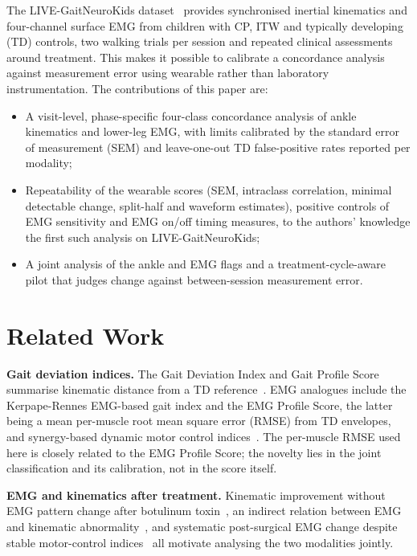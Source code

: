 \documentclass[conference]{IEEEtran}
\newcommand{\rone}[1]{{\color{rI}#1}}
\newcommand{\rtwo}[1]{{\color{rII}#1}}
\newcommand{\rthree}[1]{{\color{rIII}#1}}
\newcommand{\rone}[1]{#1}
\newcommand{\rtwo}[1]{#1}
\newcommand{\rthree}[1]{#1}
\begin{document}
The LIVE-GaitNeuroKids dataset~\cite{fernandez2026live,zenodo2026live} provides synchronised inertial kinematics and four-channel surface EMG from children with CP, ITW and typically developing (TD) controls, two walking trials per session and repeated clinical assessments around treatment. This makes it possible to calibrate a concordance analysis against measurement error using wearable rather than laboratory instrumentation. The contributions of this paper are:
\begin{itemize}
\item A visit-level, phase-specific four-class concordance analysis of ankle kinematics and lower-leg EMG, \rtwo{with limits calibrated by the standard error of measurement (SEM) and leave-one-out TD false-positive rates reported per modality;}
\item \rtwo{Repeatability of the wearable scores (SEM, intraclass correlation, minimal detectable change, split-half and waveform estimates), positive controls of EMG sensitivity and} \rthree{EMG on/off timing measures,} to the authors' knowledge the first such analysis on LIVE-GaitNeuroKids;
\item \rtwo{A joint analysis of the ankle and EMG flags} and \rone{a treatment-cycle-aware pilot that judges change against between-session measurement error.}
\end{itemize}

\section{Related Work}
\textbf{Gait deviation indices.} The Gait Deviation Index and Gait Profile Score summarise kinematic distance from a TD reference~\cite{schwartz2008gdi,baker2009gps}. EMG analogues include the Kerpape-Rennes EMG-based gait index and the EMG Profile Score, the latter being a mean per-muscle root mean square error (RMSE) from TD envelopes, and synergy-based dynamic motor control indices~\cite{davoudi2025fingerprint,schwartz2016dmc}. The per-muscle RMSE used here is closely related to the EMG Profile Score; the novelty lies in the joint classification and its calibration, not in the score itself.

\textbf{EMG and kinematics after treatment.} Kinematic improvement without EMG pattern change after botulinum toxin~\cite{vanderhouwen2011btx}, an indirect relation between EMG and kinematic abnormality~\cite{syczewska2016emg}, and systematic post-surgical EMG change despite stable motor-control indices~\cite{davoudi2025fingerprint} all motivate analysing the two modalities jointly.
\end{document}
